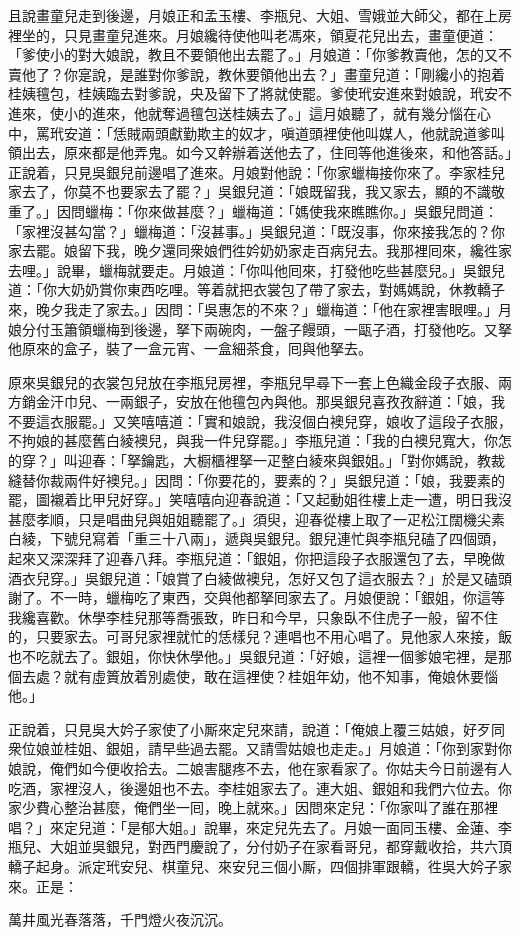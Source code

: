 且說畫童兒走到後邊，月娘正和孟玉樓、李瓶兒、大姐、雪娥並大師父，都在上房裡坐的，只見畫童兒進來。月娘纔待使他叫老馮來，領夏花兒出去，畫童便道：「爹使小的對大娘說，教且不要領他出去罷了。」月娘道：「你爹教賣他，怎的又不賣他了？你寔說，是誰對你爹說，教休要領他出去？」畫童兒道：「剛纔小的抱着桂姨氊包，桂姨臨去對爹說，央及留下了將就使罷。爹使玳安進來對娘說，玳安不進來，使小的進來，他就奪過氊包送桂姨去了。」這月娘聽了，就有幾分惱在心中，罵玳安道：「恁賊兩頭獻勤欺主的奴才，嗔道頭裡使他叫媒人，他就說道爹叫領出去，原來都是他弄鬼。如今又幹辦着送他去了，住囘等他進後來，和他答話。」正說着，只見吳銀兒前邊唱了進來。月娘對他說：「你家蠟梅接你來了。李家桂兒家去了，你莫不也要家去了罷？」吳銀兒道：「娘既留我，我又家去，顯的不識敬重了。」因問蠟梅：「你來做甚麼？」蠟梅道：「媽使我來瞧瞧你。」吳銀兒問道：「家裡沒甚勾當？」蠟梅道：「沒甚事。」吳銀兒道：「既沒事，你來接我怎的？你家去罷。娘留下我，晚夕還同衆娘們徃妗奶奶家走百病兒去。我那裡囘來，纔徃家去哩。」說畢，蠟梅就要走。月娘道：「你叫他囘來，打發他吃些甚麼兒。」吳銀兒道：「你大奶奶賞你東西吃哩。等着就把衣裳包了帶了家去，對媽媽說，休教轎子來，晚夕我走了家去。」因問：「吳惠怎的不來？」蠟梅道：「他在家裡害眼哩。」月娘分付玉簫領蠟梅到後邊，拏下兩碗肉，一盤子饅頭，一甌子酒，打發他吃。又拏他原來的盒子，裝了一盒元宵、一盒細茶食，囘與他拏去。

原來吳銀兒的衣裳包兒放在李瓶兒房裡，李瓶兒早尋下一套上色織金段子衣服、兩方銷金汗巾兒、一兩銀子，安放在他氊包內與他。那吳銀兒喜孜孜辭道：「娘，我不要這衣服罷。」又笑嘻嘻道：「實和娘說，我沒個白襖兒穿，娘收了這段子衣服，不拘娘的甚麼舊白綾襖兒，與我一件兒穿罷。」李瓶兒道：「我的白襖兒寬大，你怎的穿？」叫迎春：「拏鑰匙，大橱櫃裡拏一疋整白綾來與銀姐。」「對你媽說，教裁縫替你裁兩件好襖兒。」因問：「你要花的，要素的？」吳銀兒道：「娘，我要素的罷，圖襯着比甲兒好穿。」笑嘻嘻向迎春說道：「又起動姐徃樓上走一遭，明日我沒甚麼孝順，只是唱曲兒與姐姐聽罷了。」須臾，迎春從樓上取了一疋松江闊機尖素白綾，下號兒寫着「重三十八兩」，遞與吳銀兒。銀兒連忙與李瓶兒磕了四個頭，起來又深深拜了迎春八拜。李瓶兒道：「銀姐，你把這段子衣服還包了去，早晚做酒衣兒穿。」吳銀兒道：「娘賞了白綾做襖兒，怎好又包了這衣服去？」於是又磕頭謝了。不一時，蠟梅吃了東西，交與他都拏囘家去了。月娘便說：「銀姐，你這等我纔喜歡。休學李桂兒那等喬張致，昨日和今早，只象臥不住虎子一般，留不住的，只要家去。可哥兒家裡就忙的恁樣兒？連唱也不用心唱了。見他家人來接，飯也不吃就去了。銀姐，你快休學他。」吳銀兒道：「好娘，這裡一個爹娘宅裡，是那個去處？就有虛篢放着別處使，敢在這裡使？桂姐年幼，他不知事，俺娘休要惱他。」{}

正說着，只見吳大妗子家使了小厮來定兒來請，說道：「俺娘上覆三姑娘，好歹同衆位娘並桂姐、銀姐，請早些過去罷。又請雪姑娘也走走。」月娘道：「你到家對你娘說，俺們如今便收拾去。二娘害腿疼不去，他在家看家了。你姑夫今日前邊有人吃酒，家裡沒人，後邊姐也不去。李桂姐家去了。連大姐、銀姐和我們六位去。你家少費心整治甚麼，俺們坐一囘，晚上就來。」因問來定兒：「你家叫了誰在那裡唱？」來定兒道：「是郁大姐。」說畢，來定兒先去了。月娘一面同玉樓、金蓮、李瓶兒、大姐並吳銀兒，對西門慶說了，分付奶子在家看哥兒，都穿戴收拾，共六頂轎子起身。派定玳安兒、棋童兒、來安兒三個小厮，四個排軍跟轎，徃吳大妗子家來。正是：

\begin{myquote}
萬井風光春落落，千門燈火夜沉沉。
\end{myquote}

